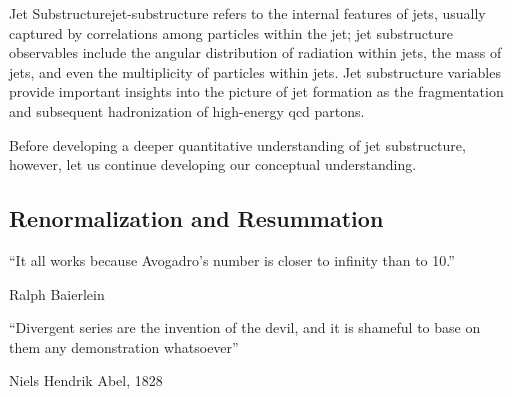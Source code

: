 \begin{definitionbox}{Jet Substructure}{jet-substructure}
     refers to the internal features of jets, usually captured by correlations among particles within the jet;
    jet substructure observables include the angular distribution of radiation within jets, the mass of jets, and even the multiplicity of particles within jets.
    Jet substructure variables provide important insights into the picture of jet formation as the fragmentation and subsequent hadronization of high-energy \gls{qcd} partons.
\end{definitionbox}

Before developing a deeper quantitative understanding of jet substructure, however, let us continue developing our conceptual understanding.






\subsection{Renormalization and Resummation}
\label{sec:renormalization}

\epigraph{``It all works because Avogadro's number is closer to infinity than to 10.''}{Ralph Baierlein}

\epigraph{``Divergent series are the invention of the devil, and it is shameful to base on them any demonstration whatsoever''}{Niels Hendrik Abel, 1828}

